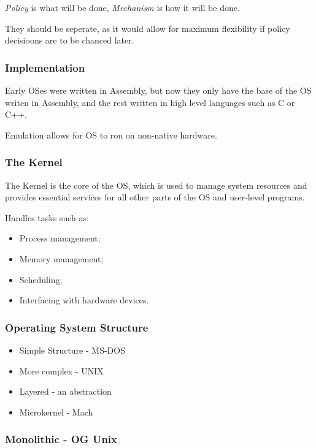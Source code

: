 \documentclass[]{article}
\begin{document}
\emph{Policy} is what will be done, \emph{Mechanism} is how it will be done.

They should be seperate, as it would allow for maximum flexibility if policy decisioons are to be chanced later.

\subsubsection*{Implementation}

Early OSes were written in Assembly, but now they only have the base of the OS writen in Assembly, and the rest written in high level languages such as C or C++.

Emulation allows for OS to ron on non-native hardware.

\subsubsection*{The Kernel}

The Kernel is the core of the OS, which is used to manage system resources and provides essential services for all other parts of the OS and user-level programs.

Handles tasks such as:
\begin{itemize}
    \item Process management;
    \item Memory management;
    \item Scheduling;
    \item Interfacing with hardware devices.
\end{itemize}

\subsubsection*{Operating System Structure}

\begin{itemize}
    \item Simple Structure - MS-DOS
    \item More complex - UNIX
    \item Layered - an abstraction
    \item Microkernel - Mach
\end{itemize}

\subsubsection*{Monolithic - OG Unix}
\end{document}
